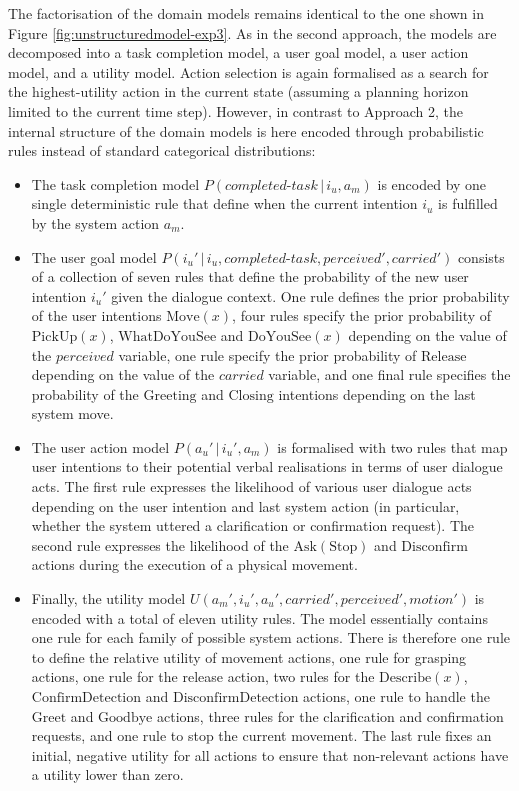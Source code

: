 The factorisation of the domain models remains identical to the one shown in Figure \ref{fig:unstructuredmodel-exp3}.  As in the second approach, the models are decomposed into a task completion model, a user goal model, a user action model, and a utility model.  Action selection is again formalised as a search for the highest-utility action in the current state (assuming a planning horizon limited to the current time step).  However, in contrast to Approach 2, the internal structure of the domain models is here encoded through probabilistic rules instead of standard categorical distributions:
\begin{itemize}
\item The task completion model $P(\mathit{completed\mbox{-}task}\, | \, i_u, a_m)$ is encoded by one single deterministic rule that define when the current intention $i_u$ is fulfilled by the system action $a_m$. 
\item The user goal model $P(i_u' \, | \, i_u, \mathit{completed\mbox{-}task}, \mathit{perceived'}, \mathit{carried'})$ consists of a collection of seven rules that define the probability of the new user intention $i_u'$ given the dialogue context. One rule defines the prior probability of the user intentions $\mathrm{Move(\mathit{x})}$, four rules specify the prior probability of $\mathrm{PickUp(\mathit{x})}$, $\mathrm{WhatDoYouSee}$ and $\mathrm{DoYouSee(\mathit{x})}$ depending on the value of the $\mathit{perceived}$ variable, one rule specify the prior probability of $\mathrm{Release}$ depending on the value of the $\mathit{carried}$ variable, and one final rule specifies the probability of the $\mathrm{Greeting}$ and $\mathrm{Closing}$ intentions depending on the last system move. 

\item The user action model $P(a_u'\, | \, i_u', a_m)$ is formalised with two rules that map user intentions to their potential verbal realisations in terms of user dialogue acts. The first rule expresses the likelihood of various user dialogue acts depending on the user intention and last system action (in particular, whether the system uttered a clarification or confirmation request).  The second rule expresses the likelihood of the $\mathrm{Ask(Stop)}$ and $\mathrm{Disconfirm}$ actions during the execution of a physical movement.

\item Finally, the utility model $U(a_m', i_u', a_u', \mathit{carried'}, \mathit{perceived'}, \mathit{motion'})$ is encoded with a total of eleven utility rules.  The model essentially contains one rule for each family of possible system actions.  There is therefore one rule to define the relative utility of movement actions, one rule for grasping actions, one rule for the release action, two rules for the $\mathrm{Describe(\mathit{x})}$, $\mathrm{ConfirmDetection}$ and $\mathrm{DisconfirmDetection}$ actions, one rule to handle the  $\mathrm{Greet}$ and $\mathrm{Goodbye}$ actions, three rules for the clarification and confirmation requests, and one rule to stop the current movement. The last rule fixes an initial, negative utility for all actions to ensure that non-relevant actions have a utility lower than zero.  


\end{itemize}
